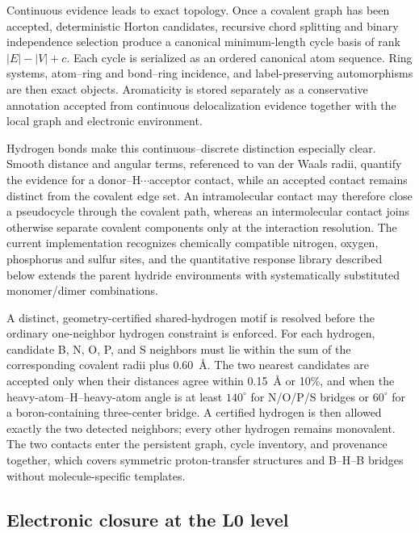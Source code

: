 \documentclass[journal=jctcce,manuscript=article]{achemso}
\begin{document}
Continuous evidence leads to exact topology.  Once a covalent
graph has been accepted, deterministic Horton candidates, recursive chord
splitting and binary independence selection produce a canonical minimum-length cycle basis
of rank $|E|-|V|+c$.\cite{Horton1987,ring_perception_2000,ring_path_2009}
Each cycle is serialized as an ordered canonical atom sequence.  Ring systems,
atom--ring and bond--ring incidence, and label-preserving automorphisms are
then exact objects.  Aromaticity is stored separately as a conservative
annotation accepted from continuous delocalization evidence together with
the local graph and electronic environment.

Hydrogen bonds make this continuous--discrete distinction especially clear.
Smooth distance and angular terms, referenced to van der Waals radii, quantify
the evidence for a donor--H$\cdots$acceptor contact,\cite{uff_1992} while an
accepted contact remains distinct from the covalent edge set.  An
intramolecular contact may therefore close a pseudocycle through the covalent
path, whereas an intermolecular contact joins otherwise separate covalent
components only at the interaction resolution.  The current implementation
recognizes chemically compatible nitrogen, oxygen, phosphorus and sulfur
sites, and the quantitative response library described below extends the
parent hydride environments with systematically substituted monomer/dimer
combinations.

A distinct, geometry-certified shared-hydrogen motif is
resolved before the ordinary one-neighbor hydrogen constraint is enforced.
For each hydrogen, candidate B, N, O, P, and S neighbors must lie within the
sum of the corresponding covalent radii plus 0.60~\AA.  The two nearest
candidates are accepted only when their distances agree within 0.15~\AA{} or
10\%, and when the heavy-atom--H--heavy-atom angle is at least
\(140^\circ\) for N/O/P/S bridges or \(60^\circ\) for a
boron-containing three-center bridge.  A certified hydrogen is then allowed
exactly the two detected neighbors; every other hydrogen remains monovalent.
The two contacts enter the persistent graph, cycle inventory, and provenance
together, which covers symmetric proton-transfer structures and B--H--B
bridges without molecule-specific templates.

\subsection{Electronic closure at the L0 level}
\end{document}
